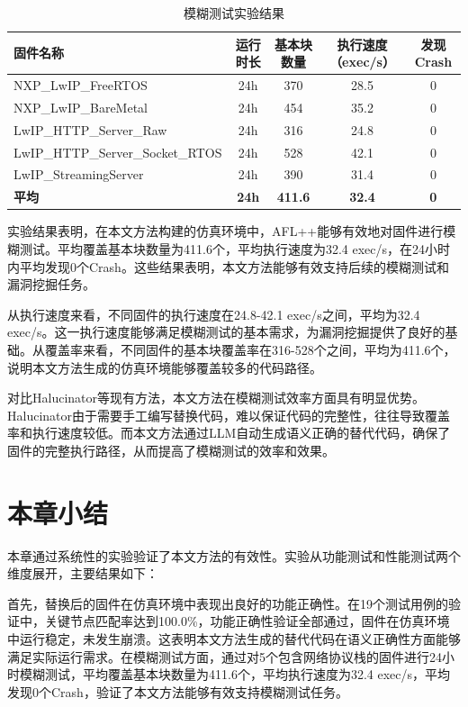 \begin{table}[htbp]
\centering
\caption{模糊测试实验结果}
\label{tab:fuzz_results}
\begin{tabular}{lcccc}
\toprule
\textbf{固件名称} & \textbf{运行时长} & \textbf{基本块数量} & \textbf{执行速度（exec/s）} & \textbf{发现 Crash} \\
\midrule
NXP\_LwIP\_FreeRTOS & 24h & 370 & 28.5 & 0 \\
NXP\_LwIP\_BareMetal & 24h & 454 & 35.2 & 0 \\
LwIP\_HTTP\_Server\_Raw & 24h & 316 & 24.8 & 0 \\
LwIP\_HTTP\_Server\_Socket\_RTOS & 24h & 528 & 42.1 & 0 \\
LwIP\_StreamingServer & 24h & 390 & 31.4 & 0 \\
\midrule
\textbf{平均} & \textbf{24h} & \textbf{411.6} & \textbf{32.4} & \textbf{0} \\
\bottomrule
\end{tabular}
\end{table}

实验结果表明，在本文方法构建的仿真环境中，AFL++能够有效地对固件进行模糊测试。平均覆盖基本块数量为411.6个，平均执行速度为32.4 exec/s，在24小时内平均发现0个Crash。这些结果表明，本文方法能够有效支持后续的模糊测试和漏洞挖掘任务。

从执行速度来看，不同固件的执行速度在24.8-42.1 exec/s之间，平均为32.4 exec/s。这一执行速度能够满足模糊测试的基本需求，为漏洞挖掘提供了良好的基础。从覆盖率来看，不同固件的基本块覆盖率在316-528个之间，平均为411.6个，说明本文方法生成的仿真环境能够覆盖较多的代码路径。

对比Halucinator等现有方法，本文方法在模糊测试效率方面具有明显优势。Halucinator由于需要手工编写替换代码，难以保证代码的完整性，往往导致覆盖率和执行速度较低。而本文方法通过LLM自动生成语义正确的替代代码，确保了固件的完整执行路径，从而提高了模糊测试的效率和效果。

\section{本章小结}
\label{sec:chap4_summary}

本章通过系统性的实验验证了本文方法的有效性。实验从功能测试和性能测试两个维度展开，主要结果如下：

首先，替换后的固件在仿真环境中表现出良好的功能正确性。在19个测试用例的验证中，关键节点匹配率达到100.0\%，功能正确性验证全部通过，固件在仿真环境中运行稳定，未发生崩溃。这表明本文方法生成的替代代码在语义正确性方面能够满足实际运行需求。在模糊测试方面，通过对5个包含网络协议栈的固件进行24小时模糊测试，平均覆盖基本块数量为411.6个，平均执行速度为32.4 exec/s，平均发现0个Crash，验证了本文方法能够有效支持模糊测试任务。

